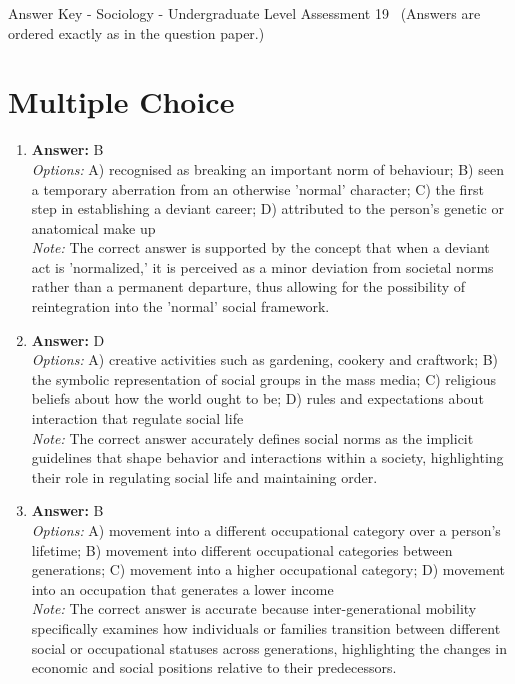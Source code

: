 \documentclass[12pt]{article}
\begin{document}
\begin{center}
Answer Key - Sociology - Undergraduate Level Assessment 19 \
\small (Answers are ordered exactly as in the question paper.)
\end{center}

\section*{Multiple Choice}
\begin{enumerate}[label=\arabic*.]
\item \textbf{Answer:} B
\\ \textit{Options:} A) recognised as breaking an important norm of behaviour; B) seen a temporary aberration from an otherwise 'normal' character; C) the first step in establishing a deviant career; D) attributed to the person's genetic or anatomical make up
\\ \textit{Note:} The correct answer is supported by the concept that when a deviant act is 'normalized,' it is perceived as a minor deviation from societal norms rather than a permanent departure, thus allowing for the possibility of reintegration into the 'normal' social framework.
\item \textbf{Answer:} D
\\ \textit{Options:} A) creative activities such as gardening, cookery and craftwork; B) the symbolic representation of social groups in the mass media; C) religious beliefs about how the world ought to be; D) rules and expectations about interaction that regulate social life
\\ \textit{Note:} The correct answer accurately defines social norms as the implicit guidelines that shape behavior and interactions within a society, highlighting their role in regulating social life and maintaining order.
\item \textbf{Answer:} B
\\ \textit{Options:} A) movement into a different occupational category over a person's lifetime; B) movement into different occupational categories between generations; C) movement into a higher occupational category; D) movement into an occupation that generates a lower income
\\ \textit{Note:} The correct answer is accurate because inter-generational mobility specifically examines how individuals or families transition between different social or occupational statuses across generations, highlighting the changes in economic and social positions relative to their predecessors.

\end{enumerate}
\end{document}

